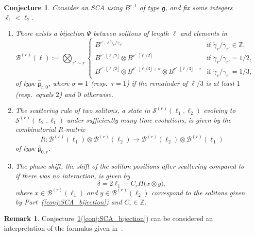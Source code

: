 \documentclass[reqno]{amsart}
\newcommand{\g}{\mathfrak{g}}
\newcommand{\Sol}{\mathcal{S}} %
\newcommand{\modgamma}{\check{\gamma}} %
\newcommand{\ZZ}{\mathbb{Z}}
\newcommand{\defn}[1]{{\color{darkred}\emph{#1}}} %
\theoremstyle{plain}
\newtheorem{conj}[thm]{Conjecture}
\theoremstyle{definition}
\newtheorem{remark}[thm]{Remark}
\numberwithin{equation}{section}
\begin{document}
\begin{conj}
\label{conj:SCA}
Consider an SCA using $B^{r,1}$ of type $\g$, and fix some integers $\ell_1 < \ell_2$.
\begin{enumerate}[{\rm (1)}]
\item \label{conj:SCA_bijection} There exists a bijection $\Psi$ between solitons of length $\ell$ and elements in
\[
\mathcal{B}^{(r)}(\ell) := \bigotimes_{r' \sim r} \begin{cases}
B^{r', \ell \modgamma_r / \gamma_{r'}} & \text{if $\modgamma_r / \gamma_{r'} \in \ZZ$}, \\
B^{r', \lfloor \ell / 2 \rfloor} \otimes B^{r', \lceil \ell / 2 \rceil} & \text{if $\modgamma_r / \gamma_{r'} = 1/2$}, \\
B^{r', \lfloor \ell / 3 \rfloor} \otimes B^{r', \lfloor \ell / 3 \rfloor + \sigma} \otimes B^{r', \lfloor \ell / 3 \rfloor + \tau} & \text{if $\modgamma_r / \gamma_{r'} = 1/3$},
\end{cases}
\]
of type $\widehat{\g}_{r,0}$, where $\sigma = 1$ (resp.~$\tau = 1$) if the remainder of $\ell / 3$ is at least $1$ (resp.\ equals $2$) and $0$ otherwise.
\item \label{conj:SCA_scattering} The \defn{scattering rule} of two solitons, a state in $\Sol^{(r)}(\ell_1, \ell_2)$ evolving to $\Sol^{(r)}(\ell_2, \ell_1)$ under sufficiently many time evolutions, is given by the combinatorial $R$-matrix
\[
R \colon \mathcal{B}^{(r)}(\ell_1) \otimes \mathcal{B}^{(r)}(\ell_2) \to \mathcal{B}^{(r)}(\ell_2) \otimes \mathcal{B}^{(r)}(\ell_1)
\]
of type $\widehat{\g}_{0,r}$.
\item \label{conj:SCA_phase_shift} The \defn{phase shift}, the shift of the soliton positions after scattering compared to if there was no interaction, is given by
\[
\delta = 2\ell_1 - C_r H\bigl(x \otimes y\bigr),
\]
where $x \in \mathcal{B}^{(r)}(\ell_1)$ and $y \in \mathcal{B}^{(r)}(\ell_2)$ correspond to the solitons given by Part~{\rm(\ref{conj:SCA_bijection})} and $C_r \in \ZZ$.
\end{enumerate}
\end{conj}

\begin{remark}
Conjecture~\ref{conj:SCA}(\ref{conj:SCA_bijection}) can be considered an interpretation of the formulas given in~\cite[App.~B]{HKOTT02}.
\end{remark}
\end{document}
